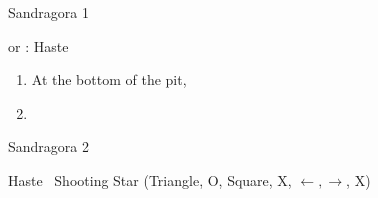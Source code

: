 \begin{battle}{Sandragora 1}
	\begin{itemize}
		\switch{\tidus}{\kimahri} or \tidus: Haste \kimahri
		\kimahrif \od\ \stonebreath
	\end{itemize}
\end{battle}
\begin{enumerate}[resume]
	\item At the bottom of the pit, \pickup{\teleportsphere}
	\item \formation{\tidus}{\rikku}{\auron}
\end{enumerate}
\begin{battle}{Sandragora 2}
	\begin{itemize}
		\tidusf Haste \auron
		\auronf \od\ Shooting Star (Triangle, O, Square, X, $\leftarrow, \rightarrow$, X)
	\end{itemize}
\end{battle}
\ \lossvfill \ \lossnewline \losscb \ 